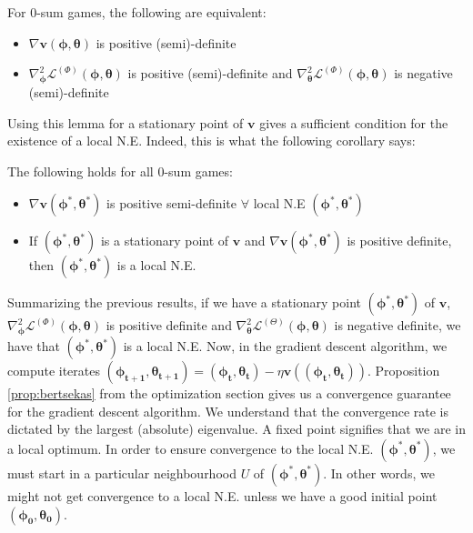 \documentclass{article}
\renewcommand{\vec}[1]{\ensuremath{\boldsymbol{#1}}}
\begin{document}
\begin{lem}
For $0$-sum games, the following are equivalent:
\begin{itemize}
    \item $\nabla\vec{v}(\vec{\phi},\vec{\theta})$ is positive (semi)-definite
    \item $\nabla^2_{\vec{\phi}} \mathcal{L}^{(\Phi)}(\vec{\phi}, \vec{\theta})$ is positive (semi)-definite and $\nabla^2_{\vec{\theta}} \mathcal{L}^{(\Phi)}(\vec{\phi}, \vec{\theta})$ is negative (semi)-definite
\end{itemize}
\end{lem}
Using this lemma for a stationary point of $\vec{v}$ gives a sufficient condition for the existence of a local N.E. Indeed, this is what the following corollary says:
\begin{cor}
The following holds for all $0$-sum games:
\begin{itemize}
\item $\nabla\vec{v}(\vec{\phi}^*,\vec{\theta}^*)$ is positive semi-definite $\forall$ local N.E $(\vec{\phi^*},\vec{\theta^*})$

\item If $(\vec{\phi^*},\vec{\theta^*})$ is a  stationary point of $\vec{v}$ and $\nabla\vec{v}(\vec{\phi^*},\vec{\theta^*})$ is positive definite, then $(\vec{\phi^*},\vec{\theta^*})$ is a local N.E.
\end{itemize}
\end{cor}
Summarizing the previous results, if we have a stationary point $(\vec{\phi^*},\vec{\theta^*})$ of $\vec{v}$, $\nabla_{\vec{\phi}}^2 \mathcal{L}^{(\Phi)}(\vec{\phi},\vec{\theta})$ is positive definite and $\nabla_{\vec{\theta}}^2 \mathcal{L}^{(\Theta)}(\vec{\phi},\vec{\theta})$ is negative definite,  we have that $(\vec{\phi^*},\vec{\theta^*})$ is a local N.E. Now, in the gradient descent algorithm, we compute iterates $(\vec{\phi_{t+1}},\vec{\theta_{t+1}}) = (\vec{\phi_t},\vec{\theta_t}) - \eta \vec{v}((\vec{\phi_t},\vec{\theta_t}))$. Proposition \ref{prop:bertsekas} from the optimization section gives us a convergence guarantee for the gradient descent algorithm. We understand that the convergence rate is dictated by the largest (absolute) eigenvalue. A fixed point signifies that we are in a local optimum. In order to ensure convergence to the local N.E. $(\vec{\phi^*},\vec{\theta^*})$, we must start in a particular neighbourhood $U$ of $(\vec{\phi^*},\vec{\theta^*})$. In other words, we might not get convergence to a local N.E. unless we have a good initial point $(\vec{\phi_0},\vec{\theta_0})$.\\
\end{document}
